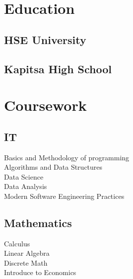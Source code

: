 \documentclass[]{resume}
\begin{document}

%
%

\begin{minipage}[t]{0.33\textwidth} 


\section{Education} 

\subsection{HSE University}
\sectionsep

\subsection{Kapitsa High School}
\sectionsep



\section{Coursework}
\subsection{IT}
Basics and Methodology of programming \\
Algorithms and Data Structures \\
Data Science  \\
Data Analysis \\
Modern Software Engineering Practices \\
\sectionsep

\subsection{Mathematics}
Calculus \\
Linear Algebra \\
Discrete Math \\
Introduce to Economics\\
\sectionsep


\end{minipage}
\end{document}
